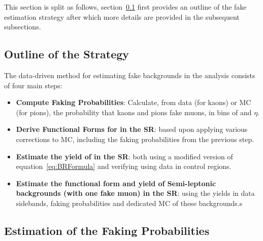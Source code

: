 This section is split as follows, section~\ref{subsec:outline-of-strategy} first provides an outline of the fake estimation strategy after which more details are provided in the subsequent subsections. 



\subsection{Outline of the Strategy}
\label{subsec:outline-of-strategy}

The data-driven method for estimating fake backgrounds in the \Bmumu analysis consists of four main steps:

\begin{itemize}
    \item \textbf{Compute Faking Probabilities}: Calculate, from data (for kaons) or MC (for pions), the probability that kaons and pions fake muons, in bins of \pT and $\eta$.
    \item \textbf{Derive Functional Forms for \Bhh in the SR}: based upon applying various corrections to \Bhh MC, including the faking probabilities from the previous step.
    \item \textbf{Estimate the yield of \Bhh in the SR}: both using a modified version of equation~\ref{eq:BRFormula} and verifying using data in control regions.
    \item \textbf{Estimate the functional form and yield of Semi-leptonic backgrounds (with one fake muon) in the SR}: using the yields in data sidebands, faking probabilities and dedicated MC of these backgrounds.s 
\end{itemize}

\subsection{Estimation of the Faking Probabilities}
\label{subsubsec:estimation-of-faking-probabilities}


